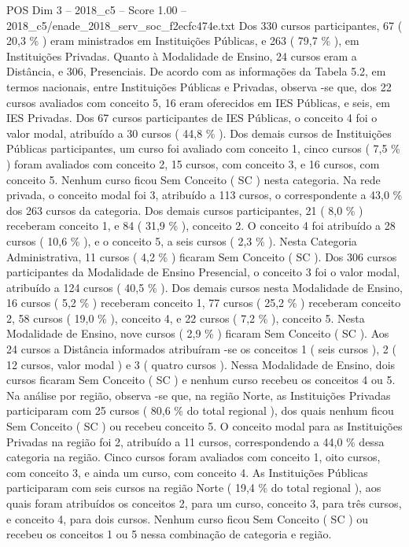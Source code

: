 \begin{textsample}{POS Dim 3 – 2018\_c5 – Score 1.00 – 2018\_c5/enade\_2018\_serv\_soc\_f2ecfc474e.txt}
Dos 330 cursos participantes, 67 ( 20,3 \% ) eram ministrados em Instituições Públicas, e 263 ( 79,7 \% ), em Instituições Privadas.
Quanto à Modalidade de Ensino, 24 cursos eram a Distância, e 306, Presenciais.
De acordo com as informações da Tabela 5.2, em termos nacionais, entre Instituições Públicas e Privadas, observa -se que, dos 22 cursos avaliados com conceito 5, 16 eram oferecidos em IES Públicas, e seis, em IES Privadas.
Dos 67 cursos participantes de IES Públicas, o conceito 4 foi o valor modal, atribuído a 30 cursos ( 44,8 \% ).
Dos demais cursos de Instituições Públicas participantes, um curso foi avaliado com conceito 1, cinco cursos ( 7,5 \% ) foram avaliados com conceito 2, 15 cursos, com conceito 3, e 16 cursos, com conceito 5.
Nenhum curso ficou Sem Conceito ( SC ) nesta categoria.
Na rede privada, o conceito modal foi 3, atribuído a 113 cursos, o correspondente a 43,0 \% dos 263 cursos da categoria.
Dos demais cursos participantes, 21 ( 8,0 \% ) receberam conceito 1, e 84 ( 31,9 \% ), conceito 2.
O conceito 4 foi atribuído a 28 cursos ( 10,6 \% ), e o conceito 5, a seis cursos ( 2,3 \% ).
Nesta Categoria Administrativa, 11 cursos ( 4,2 \% ) ficaram Sem Conceito ( SC ).
Dos 306 cursos participantes da Modalidade de Ensino Presencial, o conceito 3 foi o valor modal, atribuído a 124 cursos ( 40,5 \% ).
Dos demais cursos nesta Modalidade de Ensino, 16 cursos ( 5,2 \% ) receberam conceito 1, 77 cursos ( 25,2 \% ) receberam conceito 2, 58 cursos ( 19,0 \% ), conceito 4, e 22 cursos ( 7,2 \% ), conceito 5.
Nesta Modalidade de Ensino, nove cursos ( 2,9 \% ) ficaram Sem Conceito ( SC ).
Aos 24 cursos a Distância informados atribuíram -se os conceitos 1 ( seis cursos ), 2 ( 12 cursos, valor modal ) e 3 ( quatro cursos ).
Nessa Modalidade de Ensino, dois cursos ficaram Sem Conceito ( SC ) e nenhum curso recebeu os conceitos 4 ou 5.
Na análise por região, observa -se que, na região Norte, as Instituições Privadas participaram com 25 cursos ( 80,6 \% do total regional ), dos quais nenhum ficou Sem Conceito ( SC ) ou recebeu conceito 5.
O conceito modal para as Instituições Privadas na região foi 2, atribuído a 11 cursos, correspondendo a 44,0 \% dessa categoria na região.
Cinco cursos foram avaliados com conceito 1, oito cursos, com conceito 3, e ainda um curso, com conceito 4.
As Instituições Públicas participaram com seis cursos na região Norte ( 19,4 \% do total regional ), aos quais foram atribuídos os conceitos 2, para um curso, conceito 3, para três cursos, e conceito 4, para dois cursos.
Nenhum curso ficou Sem Conceito ( SC ) ou recebeu os conceitos 1 ou 5 nessa combinação de categoria e região.

\end{textsample}
